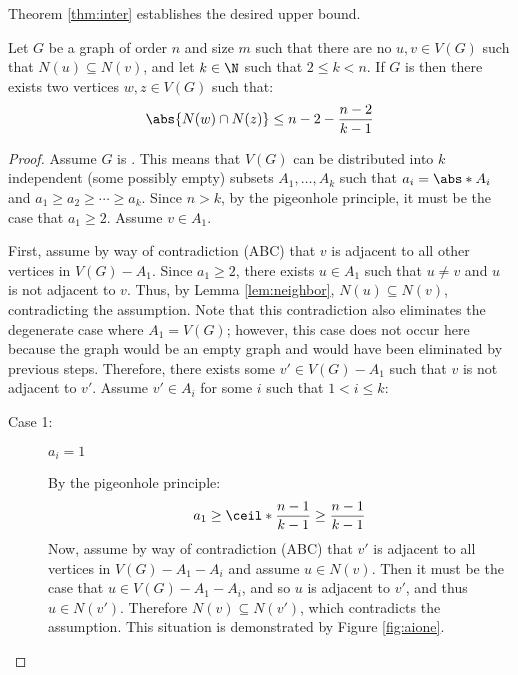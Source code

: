 Theorem \ref{thm:inter} establishes the desired upper bound.

\begin{theorem}
  \label{thm:inter}
  Let \(G\) be a graph of order \(n\) and size \(m\) such that there are no \(u,v\in V(G)\) such that
  \(N(u)\subseteq N(v)\), and let \(k\in\N\) such that \(2\le k<n\).  If \(G\) is  then there exists
  two vertices \(w,z\in V(G)\) such that:
  \[\abs{N(w)\cap N(z)}\le n-2-\frac{n-2}{k-1}\]
\end{theorem}

\begin{proof}
  Assume \(G\) is .  This means that \(V(G)\) can be distributed into \(k\) independent (some possibly
  empty) subsets \(A_1,\ldots,A_k\) such that \(a_i=\abs*{A_i}\) and \(a_1\ge a_2\ge\cdots\ge a_k\).  Since
  \(n>k\), by the pigeonhole principle, it must be the case that \(a_1\ge2\).  Assume \(v\in A_1\).

  First, assume by way of contradiction (ABC) that \(v\) is adjacent to all other vertices in \(V(G)-A_1\).  Since
  \(a_1\ge2\), there exists \(u\in A_1\) such that \(u\ne v\) and \(u\) is not adjacent to \(v\).  Thus, by Lemma
  \ref{lem:neighbor}, \(N(u)\subseteq N(v)\), contradicting the assumption.  Note that this contradiction also
  eliminates the degenerate case where \(A_1=V(G)\); however, this case does not occur here because the graph would
  be an empty graph and would have been eliminated by previous steps.  Therefore, there exists some \(v'\in
  V(G)-A_1\) such that \(v\) is not adjacent to \(v'\).  Assume \(v'\in A_i\) for some \(i\) such that \(1<i\le
  k\):

  \begin{description}
  \item [Case 1:] \(a_i=1\)

    By the pigeonhole principle:
    \[a_1\ge\ceil*{\frac{n-1}{k-1}}\ge\frac{n-1}{k-1}\]
    Now, assume by way of contradiction (ABC) that \(v'\) is adjacent to all vertices in \(V(G)-A_1-A_i\) and
    assume \(u\in N(v)\).  Then it must be the case that \(u\in V(G)-A_1-A_i\), and so \(u\) is adjacent to \(v'\),
    and thus \(u\in N(v')\).  Therefore \(N(v)\subseteq N(v')\), which contradicts the assumption.  This situation
    is demonstrated by Figure \ref{fig:aione}.


\end{description}
\end{proof}
